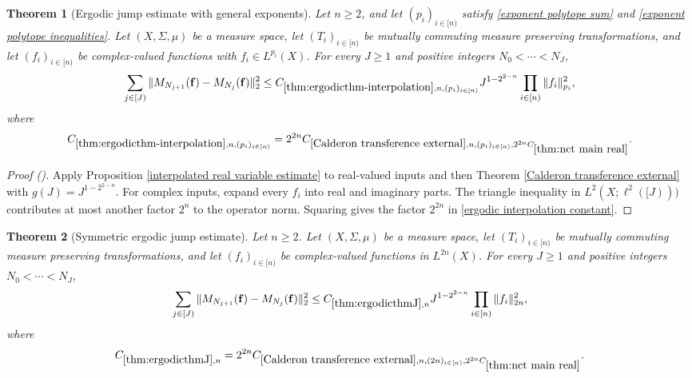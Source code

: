 \documentclass[12pt,reqno]{amsart}
\newcommand{\auto}{{({\tiny\faCar})}}
\theoremstyle{plain}
\newtheorem{theorem}{Theorem}[section]
\numberwithin{equation}{section}
\theoremstyle{remark}
\newcommand{\uses}[1]{}
\newcommand{\usesdefs}[1]{}
\begin{document}
\begin{theorem}[Ergodic jump estimate with general exponents]\label{thm:ergodicthm-interpolation}\uses{interpolated real variable estimate,Calderon transference external}\usesdefs{ergodic averages}
Let $n\ge2$, and let $(p_i)_{i\in[n)}$ satisfy \eqref{exponent polytope sum} and \eqref{exponent polytope inequalities}. Let $(X,\Sigma,\mu)$ be a measure space, let $(T_i)_{i\in[n)}$ be mutually commuting measure preserving transformations, and let $(f_i)_{i\in[n)}$ be complex-valued functions with $f_i\in L^{p_i}(X)$. For every $J\ge1$ and positive integers $N_0<\cdots<N_J$,
\begin{equation}\label{ergodic jump general exponents}
\sum_{j\in[J)}\|M_{N_{j+1}}(\mathbf f)-M_{N_j}(\mathbf f)\|_2^2
\le C_{\ref{thm:ergodicthm-interpolation},n,(p_i)_{i\in[n)}}J^{1-2^{2-n}}
\prod_{i\in[n)}\|f_i\|_{p_i}^2,
\end{equation}
where
\begin{equation}\label{ergodic interpolation constant}
C_{\ref{thm:ergodicthm-interpolation},n,(p_i)_{i\in[n)}}
=2^{2n}C_{\ref{Calderon transference external},n,(p_i)_{i\in[n)},2^{2n}C_{\ref{thm:nct main real}}}.
\end{equation}
\end{theorem}

\begin{proof}[Proof \auto]
Apply Proposition \ref{interpolated real variable estimate} to real-valued inputs and then Theorem \ref{Calderon transference external} with $g(J)=J^{1-2^{2-n}}$. For complex inputs, expand every $f_i$ into real and imaginary parts. The triangle inequality in $L^2(X;\ell^2([J)))$ contributes at most another factor $2^n$ to the operator norm. Squaring gives the factor $2^{2n}$ in \eqref{ergodic interpolation constant}.
\end{proof}

\begin{theorem}[Symmetric ergodic jump estimate]\label{thm:ergodicthmJ}\uses{thm:ergodicthm-interpolation}\usesdefs{ergodic averages}
Let $n\ge2$. Let $(X,\Sigma,\mu)$ be a measure space, let $(T_i)_{i\in[n)}$ be mutually commuting measure preserving transformations, and let $(f_i)_{i\in[n)}$ be complex-valued functions in $L^{2n}(X)$. For every $J\ge1$ and positive integers $N_0<\cdots<N_J$,
\begin{equation}\label{symmetric ergodic jump estimate}
\sum_{j\in[J)}\|M_{N_{j+1}}(\mathbf f)-M_{N_j}(\mathbf f)\|_2^2
\le C_{\ref{thm:ergodicthmJ},n}J^{1-2^{2-n}}
\prod_{i\in[n)}\|f_i\|_{2n}^2,
\end{equation}
where
\begin{equation}\label{symmetric ergodic jump constant}
C_{\ref{thm:ergodicthmJ},n}
=2^{2n}C_{\ref{Calderon transference external},n,(2n)_{i\in[n)},2^{2n}C_{\ref{thm:nct main real}}}.
\end{equation}
\end{theorem}
\end{document}
